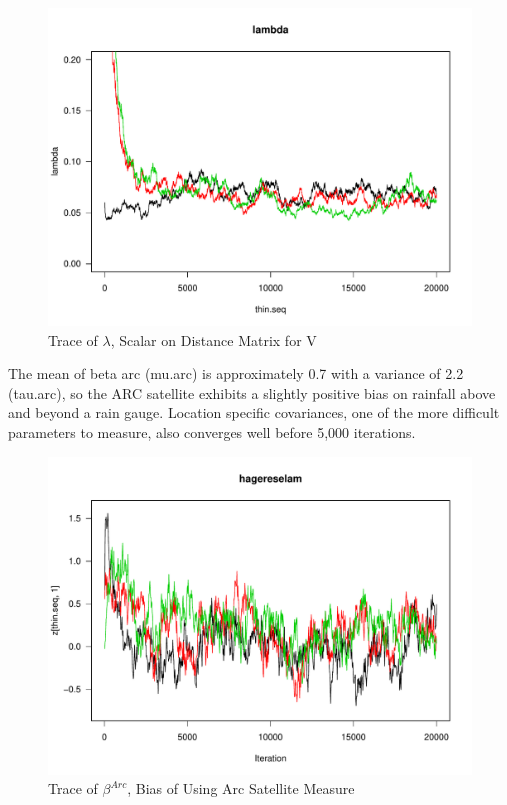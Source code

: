 \documentclass[11pt]{article}
\begin{document}
\begin{figure}[htbp]
\caption{Trace of $\lambda$, Scalar on Distance Matrix for V}
\begin{center}
\includegraphics[width=5.0in]{fig__trace_lambda.pdf}
\end{center}
\end{figure}




The mean of beta arc (mu.arc) is approximately 0.7 with a  variance of 2.2 (tau.arc), so the ARC satellite exhibits a slightly positive bias on rainfall above and beyond a rain gauge. Location specific covariances, one of the more difficult parameters to measure, also converges well before 5,000 iterations. 


\begin{figure}[htbp]
\caption{Trace of $\beta^{Arc}$, Bias of Using Arc Satellite Measure}
\begin{center}
\includegraphics[width=5.0in]{fig_tobit_trace_beta_arc.pdf}
\end{center}
\end{figure}
\end{document}
